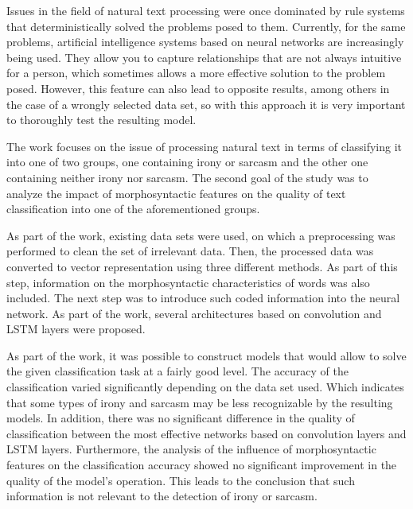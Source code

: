 

Issues in the field of natural text processing were once dominated by rule systems that deterministically solved the problems posed to them. Currently, for the same problems, artificial intelligence systems based on neural networks are increasingly being used. They allow you to capture relationships that are not always intuitive for a person, which sometimes allows a more effective solution to the problem posed. However, this feature can also lead to opposite results, among others in the case of a wrongly selected data set, so with this approach it is very important to thoroughly test the resulting model.

The work focuses on the issue of processing natural text in terms of classifying it into one of two groups, one containing irony or sarcasm and the other one containing neither irony nor sarcasm. The second goal of the study was to analyze the impact of morphosyntactic features on the quality of text classification into one of the aforementioned groups.

As part of the work, existing data sets were used, on which a preprocessing was performed to clean the set of irrelevant data. Then, the processed data was converted to vector representation using three different methods. As part of this step, information on the morphosyntactic characteristics of words was also included. The next step was to introduce such coded information into the neural network. As part of the work, several architectures based on convolution and LSTM layers were proposed.

As part of the work, it was possible to construct models that would allow to solve the given classification task at a fairly good level. The accuracy of the classification varied significantly depending on the data set used. Which indicates that some types of irony and sarcasm may be less recognizable by the resulting models. In addition, there was no significant difference in the quality of classification between the most effective networks based on convolution layers and LSTM layers. Furthermore, the analysis of the influence of morphosyntactic features on the classification accuracy showed no significant improvement in the quality of the model's operation. This leads to the conclusion that such information is not relevant to the detection of irony or sarcasm.




